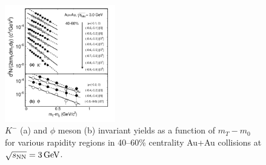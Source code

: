 \documentclass[%
 reprint,	
showpacs,
 amsmath,amssymb,
 aps,
 superscriptaddress,
]{revtex4-1}
\begin{document}
\begin{figure}
\centering
\includegraphics[width=0.43\textwidth]{fig23-eps-converted-to.pdf}
\caption{$K^-$ (a) and $\phi$ meson (b) invariant yields as a function of $m_T-m_0$ for various rapidity regions in 40--60\% centrality Au+Au collisions at ${\sqrt{s_{\rm NN}} = \rm{3\,GeV}}$.}
\label{fig:phimTSpectra23}
\end{figure}
\end{document}
